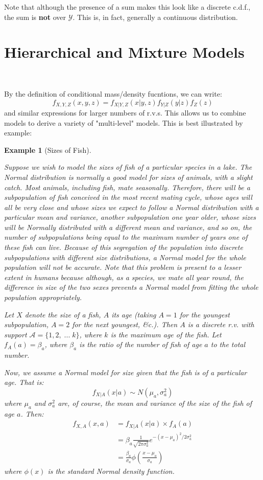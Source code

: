 \documentclass[12pt,a4paper]{article}
\newtheorem{ex}[thm]{Example}
\begin{document}
Note that although the presence of a sum makes this look like a discrete c.d.f., the sum is \textbf{not} over $\mathcal{Y}$. This is, in fact, generally a continuous distribution.

\clearpage
\section{Hierarchical and Mixture Models}$\;$

By the definition of conditional mass/density fucntions, we can write:
$$f_{X,Y,Z}(x,y,z) = f_{X|Y,Z}(x|y,z) f_{Y|Z}(y|z) f_Z(z)$$
and similar expressions for larger numbers of r.v.s. This allows us to combine models to derive a variety of "multi-level" models. This is best illustrated by example:

\begin{ex}[Sizes of Fish]$\quad$\par\vspace{1cm}

Suppose we wish to model the sizes of fish of a particular species in a lake. The Normal distribution is normally a good model for sizes of animals, with a slight catch. Most animals, including fish, mate seasonally. Therefore, there will be a subpopulation of fish conceived in the most recent mating cycle, whose ages will all be very close and whose sizes we expect to follow a Normal distribution with a particular mean and variance, another subpopulation one year older, whose sizes will be Normally distributed \emph{with a different mean and variance}, and so on, the number of subpopulations being equal to the maximum number of years one of these fish can live. Because of this segregation of the population into discrete subpopulations with different size distributions, a Normal model for the whole population will not be accurate. Note that this problem is present to a lesser extent in humans because although, as a species, we mate all year round, the difference in size of the two sexes prevents a Normal model from fitting the whole population appropriately.

Let $X$ denote the size of a fish, $A$ its age (taking $A=1$ for the youngest subpopulation, $A=2$ for the next youngest, \&c.). Then $A$ is a discrete r.v. with support $\mathcal{A} = \{1,2,\; ...\; k\}$, where $k$ is the maximum age of the fish. Let $f_A(a) = \beta_a$, where $\beta_a$ is the ratio of the number of fish of age $a$ to the total number.

Now, we assume a Normal model for size \emph{given that the fish is of a particular age}. That is:
$$f_{X|A}(x|a) \sim N(\mu_a,\sigma_a^2)$$
where $\mu_a$ and $\sigma_a^2$ are, of course, the mean and variance of the size of the fish of age $a$. Then:
\begin{align*}
f_{X,A}(x,a) &= f_{X|A}(x|a) \times f_A(a)\\
&= \beta_a \frac{1}{\sqrt{2 \pi \sigma^2_a}} e^{-(x-\mu_a)^2/2\sigma^2_a}\\
&= \frac{\beta_a}{\sigma_{a}} \phi\left(\frac{x-\mu_a}{\sigma_a}\right)
\end{align*}
where $\phi(x)$ is the standard Normal density function.


\end{ex}
\end{document}

